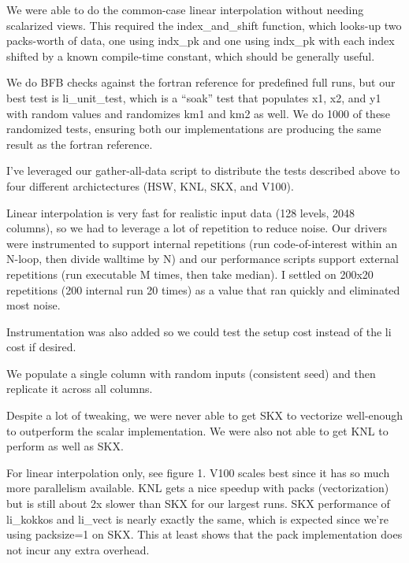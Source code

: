 \documentclass[10pt,twocolumn]{article}
\begin{document}
We were able to do the common-case linear interpolation without needing scalarized
views. This required the index\_and\_shift function, which looks-up two packs-worth
of data, one using indx\_pk and one using indx\_pk with each index shifted by a known
compile-time constant, which should be generally useful.


We do BFB checks against the fortran reference for predefined full runs, but our best test is
li\_unit\_test, which is a ``soak'' test that populates x1, x2, and y1 with random
values and randomizes km1 and km2 as well. We do 1000 of these randomized tests,
ensuring both our implementations are producing the same result as the fortran reference.

I've leveraged our gather-all-data script to distribute the tests described above to four different
archictectures (HSW, KNL, SKX, and V100).


Linear interpolation is very fast for realistic input data (128 levels, 2048 columns), so we
had to leverage a lot of repetition to reduce noise. Our drivers were instrumented to support
internal repetitions (run code-of-interest within an N-loop, then divide walltime by N) and our performance scripts
support external repetitions (run executable M times, then take median). I settled on
200x20 repetitions (200 internal run 20 times) as a value that ran quickly and eliminated
most noise.

Instrumentation was also added so we could test the setup cost instead of the li cost
if desired.

We populate a single column with random inputs (consistent seed) and then replicate it
across all columns.


Despite a lot of tweaking, we were never able to get SKX to vectorize well-enough to outperform
the scalar implementation. We were also not able to get KNL to perform as well as SKX.

For linear interpolation only, see figure 1. V100 scales best since it has so much more parallelism
available. KNL gets a nice speedup with packs (vectorization) but is still about 2x slower than SKX
for our largest runs. SKX performance of li\_kokkos and li\_vect is nearly exactly the same, which is
expected since we're using packsize=1 on SKX. This at least shows that the pack implementation does not incur
any extra overhead.
\end{document}
